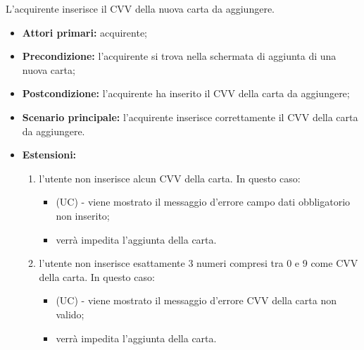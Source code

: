 L'acquirente inserisce il CVV della nuova carta da aggiungere.
\begin{itemize}
    \item \textbf{Attori primari:} acquirente;
    \item \textbf{Precondizione:} l'acquirente si trova nella schermata di aggiunta di una nuova carta;
    \item \textbf{Postcondizione:} l'acquirente ha inserito il CVV della carta da aggiungere;
    \item \textbf{Scenario principale:} l'acquirente inserisce correttamente il CVV della carta da aggiungere.
    \item \textbf{Estensioni:}
    \begin{enumerate}[label=\lett]
        \item l'utente non inserisce alcun CVV della carta. In questo caso:
        \begin{itemize}
            \item (UC) - viene mostrato il messaggio d'errore campo dati obbligatorio non inserito;
            \item verrà impedita l'aggiunta della carta.
        \end{itemize}
        \item l'utente non inserisce esattamente 3 numeri compresi tra 0 e 9 come CVV della carta. In questo caso:
        \begin{itemize}
            \item (UC) - viene mostrato il messaggio d'errore CVV della carta non valido;
            \item verrà impedita l'aggiunta della carta.
        \end{itemize}
    \end{enumerate}
\end{itemize}

